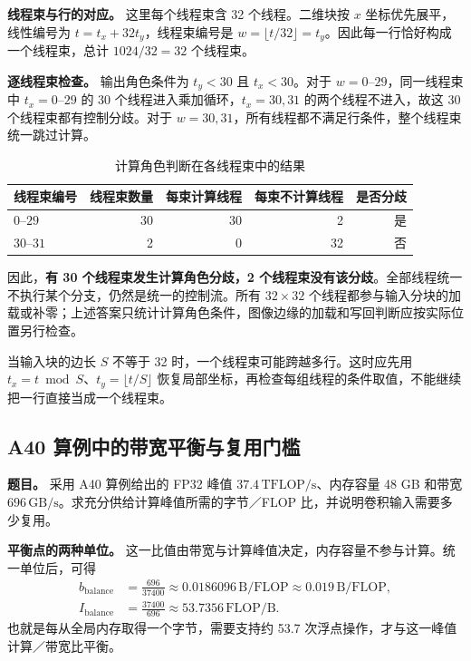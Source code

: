 \textbf{线程束与行的对应。} 这里每个线程束含 32 个线程。二维块按 $x$ 坐标优先展平，线性编号为 $t=t_x+32t_y$，线程束编号是 $w=\lfloor t/32\rfloor=t_y$。因此每一行恰好构成一个线程束，总计 $1024/32=32$ 个线程束。

\textbf{逐线程束检查。} 输出角色条件为 $t_y<30$ 且 $t_x<30$。对于 $w=0$--$29$，同一线程束中 $t_x=0$--$29$ 的 30 个线程进入乘加循环，$t_x=30,31$ 的两个线程不进入，故这 30 个线程束都有控制分歧。对于 $w=30,31$，所有线程都不满足行条件，整个线程束统一跳过计算。

\begin{table}[H]
\centering\small
\caption{计算角色判断在各线程束中的结果}
\label{l9:tab:warp-divergence}
\begin{tabular}{@{}lrrrr@{}}\toprule
线程束编号 & 线程束数量 & 每束计算线程 & 每束不计算线程 & 是否分歧\\\midrule
$0$--$29$ & 30 & 30 & 2 & 是\\
$30$--$31$ & 2 & 0 & 32 & 否\\\bottomrule
\end{tabular}
\end{table}

因此，\textbf{有 30 个线程束发生计算角色分歧，2 个线程束没有该分歧}。全部线程统一不执行某个分支，仍然是统一的控制流。所有 $32\times32$ 个线程都参与输入分块的加载或补零；上述答案只统计计算角色条件，图像边缘的加载和写回判断应按实际位置另行检查。

当输入块的边长 $S$ 不等于 32 时，一个线程束可能跨越多行。这时应先用 $t_x=t\bmod S$、$t_y=\lfloor t/S\rfloor$ 恢复局部坐标，再检查每组线程的条件取值，不能继续把一行直接当成一个线程束。

\subsection{A40 算例中的带宽平衡与复用门槛}
\textbf{题目。} 采用 A40 算例给出的 FP32 峰值 $37.4\,\mathrm{TFLOP/s}$、内存容量 48 GB 和带宽 $696\,\mathrm{GB/s}$。求充分供给计算峰值所需的字节／FLOP 比，并说明卷积输入需要多少复用。

\textbf{平衡点的两种单位。} 这一比值由带宽与计算峰值决定，内存容量不参与计算。统一单位后，可得
\begin{equation}
 \begin{aligned}
 b_{\mathrm{balance}}&=\frac{696}{37400}
 \approx0.0186096\,\mathrm{B}/\mathrm{FLOP}
 \approx0.019\,\mathrm{B}/\mathrm{FLOP},\\
 I_{\mathrm{balance}}&=\frac{37400}{696}
 \approx53.7356\,\mathrm{FLOP}/\mathrm{B}.
 \end{aligned}
 \label{l9:eq:a40-balance}
\end{equation}
也就是每从全局内存取得一个字节，需要支持约 53.7 次浮点操作，才与这一峰值计算／带宽比平衡。

